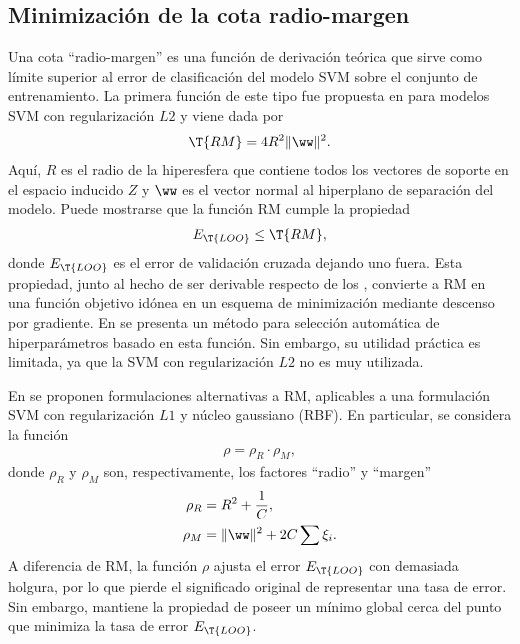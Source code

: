 %
%
\subsection{Minimización de la cota radio-margen}
%
Una cota ``radio-margen'' es una función de derivación teórica que
sirve como límite superior al error de clasificación
 del modelo SVM sobre el conjunto de
entrenamiento.
La primera función de este tipo fue propuesta en \cite{vapnik}
para modelos SVM con regularización $L2$ y viene dada por
\begin{align}
  \T{RM} = 4R^2 \|\ww\|^2.
\end{align}
%
Aquí, $R$ es el radio de la hiperesfera que contiene todos los
vectores de soporte en el espacio inducido $Z$ y $\ww$ es el vector
normal al hiperplano de separación del modelo.
Puede mostrarse que la función RM cumple la propiedad
%
\begin{align}
  E_{\T{LOO}} \leq \T{RM},
\end{align}
%
donde $E_{\T{LOO}}$ es el error de validación cruzada dejando uno
fuera.
Esta propiedad, junto al hecho de ser derivable respecto de los
, convierte a RM en una función objetivo idónea en un
esquema de minimización mediante descenso por gradiente.
En \cite{chapelle} se presenta un método para selección automática de
hiperparámetros basado en esta función.
Sin embargo, su utilidad práctica es limitada, ya que
la SVM con regularización $L2$ no es muy utilizada.

En \cite{chung} se proponen formulaciones alternativas a RM,
aplicables a una formulación SVM con regularización $L1$ y núcleo
gaussiano (RBF).
En particular, se considera la función
%
\begin{align}
  \rho = \rho_R \cdot \rho_M,
\end{align}
%
donde $\rho_R$ y $\rho_M$ son, respectivamente, los factores ``radio''
y ``margen''
%
\begin{align}
  \rho_R &= R^2+\frac{1}{C}, \\
  \rho_M &= \|\ww\|^2+2C\sum\xi_i.
\end{align}
%
A diferencia de {RM}, la función $\rho$ ajusta el error $E_{\T{LOO}}$
con demasiada holgura, por lo que pierde el significado original de
representar una tasa de error.
Sin embargo, mantiene la propiedad de poseer un mínimo global cerca
del punto que minimiza la tasa de error $E_{\T{LOO}}$.
